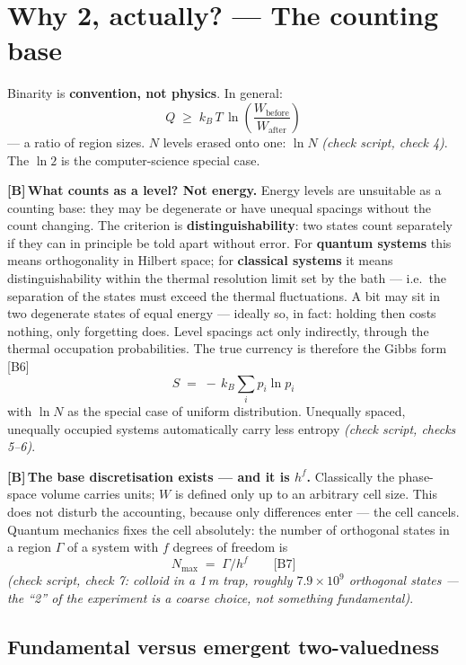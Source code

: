 \documentclass[11pt,a4paper]{article}
\newcommand{\LB}{\textcolor{layB}{\textbf{\footnotesize\textsf{[B]}}}\,}
\newcommand{\pruef}[1]{{\small\itshape(check script, #1)}}
\begin{document}
\section{Why 2, actually? --- The counting base}
\label{sec:counting}

Binarity is \textbf{convention, not physics}. In general:
\[
  Q \;\ge\; k_B\,T\,\ln\!\left(\frac{W_{\text{before}}}{W_{\text{after}}}\right)
\]
--- a ratio of region sizes. $N$ levels erased onto one: $\ln N$
\pruef{check 4}. The $\ln 2$ is the computer-science special case.

\LB \textbf{What counts as a level? Not energy.} Energy levels are unsuitable as a
counting base: they may be degenerate or have unequal spacings without the count
changing. The criterion is \textbf{distinguishability}: two states count
separately if they can in principle be told apart without error. For
\textbf{quantum systems} this means orthogonality in Hilbert space; for
\textbf{classical systems} it means distinguishability within the thermal
resolution limit set by the bath --- i.e.\ the separation of the states must
exceed the thermal fluctuations. A bit may sit in two degenerate states of equal
energy --- ideally so, in fact: holding then costs nothing, only forgetting does.
Level spacings act only indirectly, through the thermal occupation probabilities.
The true currency is therefore the Gibbs form [B6]
\[
  S \;=\; -\,k_B \sum_i p_i \ln p_i
\]
with $\ln N$ as the special case of uniform distribution. Unequally spaced,
unequally occupied systems automatically carry less entropy \pruef{checks 5--6}.

\LB \textbf{The base discretisation exists --- and it is $h^f$.} Classically the
phase-space volume carries units; $W$ is defined only up to an arbitrary cell
size. This does not disturb the accounting, because only differences enter --- the
cell cancels. Quantum mechanics fixes the cell absolutely: the number of
orthogonal states in a region $\Gamma$ of a system with $f$ degrees of freedom is
\[
  N_{\max} \;=\; \Gamma / h^f \qquad \text{[B7]}
\]
\pruef{check 7: colloid in a 1\,\textmu m trap, roughly $7.9\times10^{9}$
orthogonal states --- the “2” of the experiment is a coarse choice, not something
fundamental}.

\subsection{Fundamental versus emergent two-valuedness}
\end{document}
